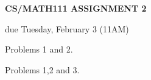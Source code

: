\documentclass{article}
\begin{document}
\centerline{\large \bf CS/MATH111 ASSIGNMENT 2}
\centerline{due Tuesday, February 3 (11AM)}

\vskip 0.1in
 Problems 1 and 2.

 Problems 1,2 and 3.

\vskip 0.1in

\end{document}
